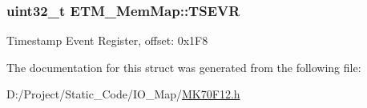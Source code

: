 \subsubsection[{T\+S\+E\+V\+R}]{\setlength{\rightskip}{0pt plus 5cm}uint32\+\_\+t E\+T\+M\+\_\+\+Mem\+Map\+::\+T\+S\+E\+V\+R}\label{struct_e_t_m___mem_map_ad30bdaff018bc7d3b586ce0ca41dfd9b}
Timestamp Event Register, offset\+: 0x1\+F8 

The documentation for this struct was generated from the following file\+:\begin{DoxyCompactItemize}
\item 
D\+:/\+Project/\+Static\+\_\+\+Code/\+I\+O\+\_\+\+Map/\hyperlink{_m_k70_f12_8h}{M\+K70\+F12.\+h}\end{DoxyCompactItemize}
